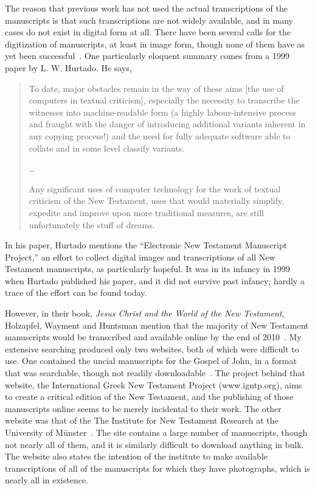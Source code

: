 \documentclass[onecolumn, 12pt]{article}
\begin{document}
The reason that previous work has not used the actual transcriptions of the
manuscripts is that such transcriptions are not widely available, and in many
cases do not exist in digital form at all.  There have been several calls for
the digitization of manuscripts, at least in image form, though none of them
have as yet been successful~\cite{trobisch-2000-central-electronic-database}.
One particularly eloquent summary comes from a 1999 paper by L. W. Hurtado.  He
says,
\begin{quotation}
To date, major obstacles remain in the way of these aims [the use of computers
in textual criticism], especially the necessity to transcribe the witnesses
into machine-readable form (a highly labour-intensive process and fraught with
the danger of introducing additional variants inherent in any copying process!)
and the need for fully adequate software able to collate and in some level
classify variants.

\ldots

Any significant uses of computer technology for the work of textual criticism
of the New Testament, uses that would materially simplify, expedite and improve
upon more traditional measures, are still unfortunately the stuff of
dreams.~\cite{hurtado-1999-beyond-the-interlude}
\end{quotation}

In his paper, Hurtado mentions the ``Electronic New Testament Manuscript
Project,'' an effort to collect digital images and transcriptions of all New
Testament manuscripts, as particularly hopeful.  It was in its infancy in 1999
when Hurtado published his paper, and it did not survive past infancy; hardly a
trace of the effort can be found today.

However, in their book, \emph{Jesus Christ and the World of the New Testament},
Holzapfel, Wayment and Huntsman mention that the majority of New Testament
manuscripts would be transcribed and available online by the end of
2010~\cite[p. 55]{holzapfel-2006-jesus-christ-new-testament}.  My extensive
searching produced only two websites, both of which were difficult to use.  One
contained the uncial manuscripts for the Gospel of John, in a format that was
searchable, though not readily downloadable~\cite{igntp-gospel-of-john-online}.
The project behind that website, the International Greek New Testament Project
(www.igntp.org), aims to create a critical edition of the New Testament, and
the publishing of those manuscripts online seems to be merely incidental to
their work.  The other website was that of the The Institute for New Testament
Research at the University of M\"{u}nster~\cite{munster-website}.   The site
contains a large number of manuscripts, though not nearly all of them, and it
is similarly difficult to download anything in bulk.  The website also states
the intention of the institute to make available transcriptions of all of the
manuscripts for which they have photographs, which is nearly all in existence.
\end{document}
